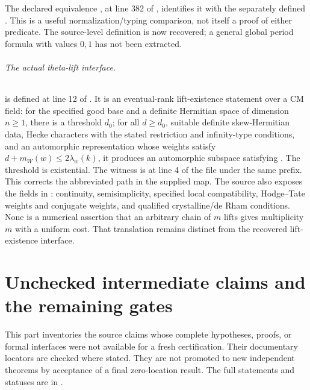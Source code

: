 \documentclass[11pt,a4paper]{article}
\theoremstyle{definition}
\begin{document}
The declared equivalence
, at line 382 of
,
identifies it with the separately defined
.  This is a useful
normalization/typing comparison, not itself a proof of either predicate.
The source-level definition is now recovered; a general global period
formula with values \(0,1\) has not been extracted.

\paragraph{The actual theta-lift interface.}
 is defined at line 12 of
.
It is an eventual-rank lift-existence statement over a CM field: for the
specified good base and a definite Hermitian space of dimension \(n\geq1\),
there is a threshold \(d_0\); for all \(d\geq d_0\), suitable definite
skew-Hermitian data, Hecke characters with the stated restriction and
infinity-type conditions, and an automorphic representation whose weights
satisfy \(d+m_W(w)\leq2\lambda_w(k)\), it produces an automorphic
subspace satisfying .  The threshold is existential.
The witness  is at line 4 of the
 file under the same
prefix.  This corrects the abbreviated path in the supplied map.
The source also exposes the  fields in
: continuity, semisimplicity,
specified local compatibility, Hodge--Tate weights and conjugate weights,
and qualified crystalline/de Rham conditions.  None is a numerical
assertion that an arbitrary chain of \(m\) lifts gives multiplicity \(m\)
with a uniform cost.  That translation remains distinct from the recovered
lift-existence interface.



\clearpage
\part{Unchecked intermediate claims and the remaining gates}
\noindent This part inventories the source claims whose complete hypotheses,
proofs, or formal interfaces were not available for a fresh certification.
Their documentary locators are checked where stated. They are not promoted
to new independent theorems by acceptance of a final zero-location result.
The full statements and statuses are in .
\end{document}
